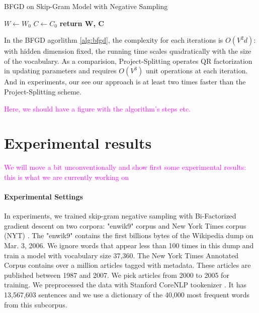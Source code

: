 \documentclass[letterpaper]{article} %
\begin{document}
\begin{algorithm}
\caption{BFGD on Skip-Gram Model with Negative Sampling}\label{alg:bfgd}
\begin{algorithmic}[1]
 
\State $W\gets W_0$
\State $C\gets C_0$
\EndFor
\State \textbf{return W, C}
\EndProcedure
\end{algorithmic}
\end{algorithm}
In the BFGD agorlithm \ref{alg:bfgd}, the complexity for each iterations is $O(V^2d)$: with hidden dimension fixed, the running time scales quadratically with the size of the vocabulary. As a comparision, Project-Splitting\cite{fonarev2017riemannian} operates QR factorization in updating parameters and requires $O(V^3)$ unit operations at each iteration. And in experiments, our see our approach is at least two times faster than the Project-Splitting scheme.

\textcolor{magenta}{Here, we should have a figure with the algorithm's steps etc.}

\section{Experimental results}
\textcolor{magenta}{We will move a bit unconventionally and show first some experimental results: this is what we are currently working on}
\paragraph{Experimental Settings} In experiments, we trained skip-gram negative sampling with Bi-Factorized gradient descent on two corpora:  "enwik9" corpus \cite{mahoney2011large} and New York Times corpus (NYT) \cite{sandhaus2008new}. The "enwik9" contains the first billions bytes of the Wikipedia dump on Mar. 3, 2006. We ignore words that appear less than 100 times in this dump and train a model with vocabulary size 37,360. The New York Times Annotated Corpus contains over a million articles tagged with metadata. These articles are published between 1987 and 2007. We pick articles from 2000 to 2005 for training.  We preprocessed the data with Stanford CoreNLP tookenizer \cite{manning2014stanford}. It has 13,567,603 sentences and we use a dictionary of the 40,000 most frequent words from this subcorpus.
\end{document}
